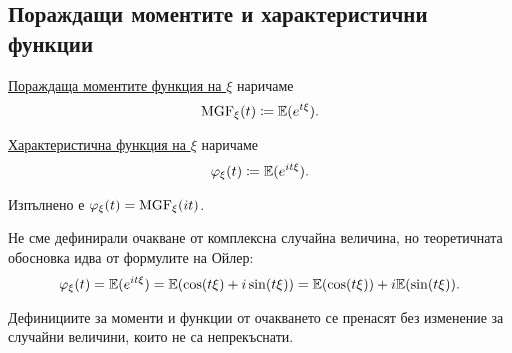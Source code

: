 \documentclass[numbers=endperiod, DIV=15, bibliography=totocnumbered]{scrartcl}
\begin{document}
\subsection{Пораждащи моментите и характеристични функции}

\begin{definition}
  \uline{Пораждаща моментите функция на $\xi$} наричаме
  \begin{displaymath}
    \operatorname{MGF}_\xi (t) \coloneqq \mathbb{E}(e^{t\xi}).
  \end{displaymath}

  \uline{Характеристична функция на $\xi$} наричаме
  \begin{displaymath}
    \varphi_\xi (t) \coloneqq \mathbb{E}(e^{it\xi}).
  \end{displaymath}

  Изпълнено е $\varphi_\xi(t) = \operatorname{MGF}_\xi(it)$.
\end{definition}

\begin{note}
  Не сме дефинирали очакване от комплексна случайна величина, но теоретичната обосновка идва от формулите на Ойлер:
  \begin{displaymath}
    \varphi_\xi (t)
    =
    \mathbb{E}(e^{it\xi})
    =
    \mathbb{E}(\cos(t\xi) + i\sin(t\xi))
    =
    \mathbb{E}(\cos(t\xi)) + i \mathbb{E}(\sin(t\xi)).
  \end{displaymath}
\end{note}

\begin{note}
  Дефинициите за моменти и функции от очакването се пренасят без изменение за случайни величини, които не са непрекъснати.
\end{note}
\end{document}
